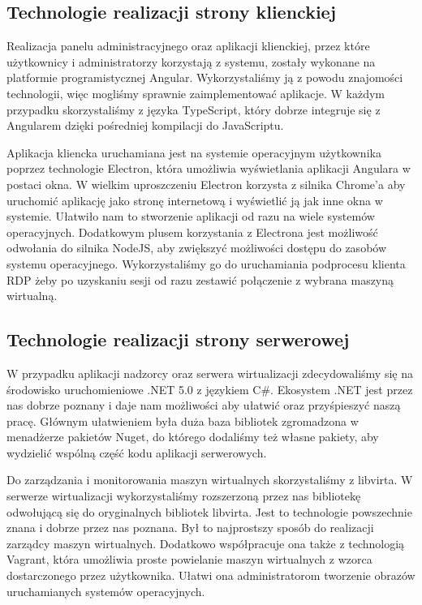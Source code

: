 \documentclass[../opis-rozwiazania.tex]{subfiles}
\begin{document}
\label{technologies}

\subsection{Technologie realizacji strony klienckiej}
Realizacja panelu administracyjnego oraz aplikacji klienckiej, przez które użytkownicy i administratorzy korzystają z systemu, zostały wykonane na platformie programistycznej Angular.
Wykorzystaliśmy ją z powodu znajomości technologii, więc mogliśmy sprawnie zaimplementować aplikacje.
W każdym przypadku skorzystaliśmy z języka TypeScript, który dobrze integruje się z Angularem dzięki pośredniej kompilacji do JavaScriptu.

Aplikacja kliencka uruchamiana jest na systemie operacyjnym użytkownika poprzez technologie Electron, która umożliwia wyświetlania aplikacji Angulara w postaci okna.
W wielkim uproszczeniu Electron korzysta z silnika Chrome'a aby uruchomić aplikację jako stronę internetową i wyświetlić ją jak inne okna w systemie.
Ułatwiło nam to stworzenie aplikacji od razu na wiele systemów operacyjnych.
Dodatkowym plusem korzystania z Electrona jest możliwość odwołania do silnika NodeJS, aby zwiększyć możliwości dostępu do zasobów systemu operacyjnego.
Wykorzystaliśmy go do uruchamiania podprocesu klienta RDP żeby po uzyskaniu sesji od razu zestawić połączenie z wybrana maszyną wirtualną.

\subsection{Technologie realizacji strony serwerowej}
W przypadku aplikacji nadzorcy oraz serwera wirtualizacji zdecydowaliśmy się na środowisko uruchomieniowe .NET 5.0 z językiem C\#.
Ekosystem .NET jest przez nas dobrze poznany i daje nam możliwości aby ułatwić oraz przyśpieszyć naszą pracę.
Głównym ułatwieniem była duża baza bibliotek zgromadzona w menadżerze pakietów Nuget, do którego dodaliśmy też własne pakiety, aby wydzielić wspólną część kodu aplikacji serwerowych.

Do zarządzania i monitorowania maszyn wirtualnych skorzystaliśmy z libvirta.
W serwerze wirtualizacji wykorzystaliśmy rozszerzoną przez nas bibliotekę odwołującą się do oryginalnych bibliotek libvirta.
Jest to technologie powszechnie znana i dobrze przez nas poznana. Był to najprostszy sposób do realizacji zarządcy maszyn wirtualnych.
Dodatkowo współpracuje ona także z technologią Vagrant, która umożliwia proste powielanie maszyn wirtualnych z wzorca dostarczonego przez użytkownika.
Ułatwi ona administratorom tworzenie obrazów uruchamianych systemów operacyjnych.
\end{document}
